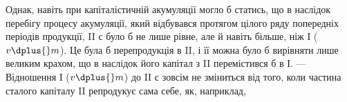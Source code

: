 Однак, навіть при капіталістичній акумуляції могло б статись, що в
наслідок перебігу процесу акумуляції, який відбувався протягом цілого
ряду попередніх періодів продукції, II с було б не лише рівне, але й навіть
більше, ніж І ($v \dplus{} m$). Це була б перепродукція в II, і її можна було б
вирівняти лише великим крахом, що в наслідок його капітал з II перемістився
б в І. — Відношення І ($v \dplus{} m$) до II с зовсім не зміниться від того,
коли частина сталого капіталу II репродукує сама себе, як, наприклад,
\parbreak{}  %
